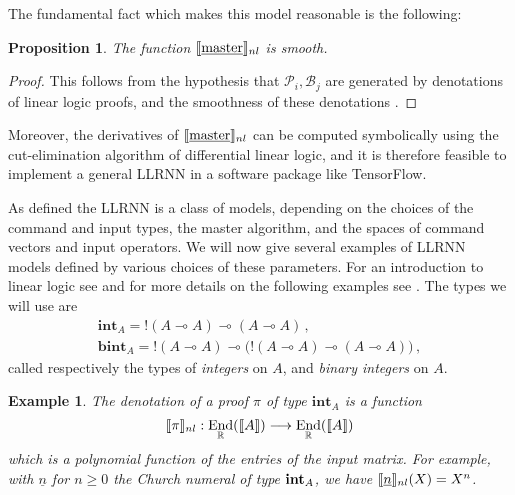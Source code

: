 \documentclass[english,letter paper,12pt,leqno]{article}
\newtheorem{proposition}[theorem]{Proposition}
\theoremstyle{example}
\newtheorem{example}[theorem]{Example}
\numberwithin{equation}{section}
\DeclareMathOperator{\End}{End}
\begin{document}
The fundamental fact which makes this model reasonable is the following:

\begin{proposition} The function $\llbracket \underline{\textup{master}} \rrbracket_{nl}$ is smooth.
\end{proposition}
\begin{proof}
This follows from the hypothesis that $\mathscr{P}_i, \mathscr{B}_j$ are generated by denotations of linear logic proofs, and the smoothness of these denotations \cite{murfetclift}.
\end{proof}

Moreover, the derivatives of $\llbracket \underline{\textup{master}} \rrbracket_{nl}$ can be computed symbolically using the cut-elimination algorithm of differential linear logic, and it is therefore feasible to implement a general LLRNN in a software package like TensorFlow. 

As defined the LLRNN is a class of models, depending on the choices of the command and input types, the master algorithm, and the spaces of command vectors and input operators. We will now give several examples of LLRNN models defined by various choices of these parameters. For an introduction to linear logic see \cite{prooftypes, murfet_ll} and for more details on the following examples see \cite[\S 3]{murfetclift}. The types we will use are
\begin{gather*}
\textbf{int}_A = {!}(A \multimap A) \multimap (A \multimap A)\,,\\
\textbf{bint}_A = {!}(A \multimap A) \multimap \big({!}(A \multimap A) \multimap (A \multimap A)\big)\,,
\end{gather*}
called respectively the types of \emph{integers} on $A$, and \emph{binary integers} on $A$. 

\begin{example}\label{example_1} The denotation of a proof $\pi$ of type $\textbf{int}_A$ is a function
\[
\den{\pi}_{nl}: \End_{\mathbb{R}}(\den{A}) \lto \End_{\mathbb{R}}(\den{A})
\]
which is a polynomial function of the entries of the input matrix. For example, with $\underline{n}$ for $n \ge 0$ the Church numeral of type $\textbf{int}_A$, we have $\llbracket \underline{n} \rrbracket_{nl}(X) = X^n$. %
\end{example}
\end{document}
